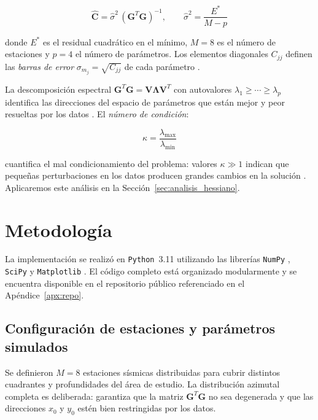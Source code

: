 \documentclass[12pt, a4paper]{article}
\begin{document}
\begin{equation}
    \widehat{\mathbf{C}}
    = \hat{\sigma}^2 \,(\mathbf{G}^T\mathbf{G})^{-1},
    \qquad
    \hat{\sigma}^2 = \frac{E^*}{M - p}
    \label{eq:covarianza}
\end{equation}

donde $E^*$ es el residual cuadrático en el mínimo, $M=8$ es el número
de estaciones y $p=4$ el número de parámetros. Los elementos diagonales
$C_{jj}$ definen las \emph{barras de error} $\sigma_{m_j} = \sqrt{C_{jj}}$
de cada parámetro \cite{aster2019parameter, menke2018geophysical}.

La descomposición espectral
$\mathbf{G}^T\mathbf{G} = \mathbf{V}\boldsymbol{\Lambda}\mathbf{V}^T$
con autovalores $\lambda_1 \ge \cdots \ge \lambda_p$ identifica las
direcciones del espacio de parámetros que están mejor y peor
resueltas por los datos \cite{backus1968resolving}. El \emph{número
de condición}:

\begin{equation}
    \kappa = \frac{\lambda_{\max}}{\lambda_{\min}}
    \label{eq:condicion}
\end{equation}

cuantifica el mal condicionamiento del problema: valores $\kappa \gg 1$
indican que pequeñas perturbaciones en los datos producen grandes
cambios en la solución \cite{golub2013matrix}. Aplicaremos este análisis
en la Sección~\ref{sec:analisis_hessiano}.

\section{Metodología}

La implementación se realizó en \texttt{Python}~3.11 utilizando las
librerías \texttt{NumPy} \cite{harris2020array}, \texttt{SciPy}
\cite{virtanen2020scipy} y \texttt{Matplotlib} \cite{hunter2007matplotlib}.
El código completo está organizado modularmente y se encuentra
disponible en el repositorio público referenciado en el
Apéndice~\ref{apx:repo}.

\subsection{Configuración de estaciones y parámetros simulados}

Se definieron $M = 8$ estaciones sísmicas distribuidas para cubrir
distintos cuadrantes y profundidades del área de estudio. La
distribución azimutal completa es deliberada: garantiza que la matriz
$\mathbf{G}^T\mathbf{G}$ no sea degenerada y que las direcciones
$x_0$ y $y_0$ estén bien restringidas por los datos.
\end{document}
